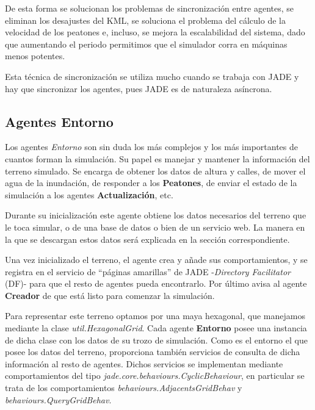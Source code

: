 De esta forma se solucionan los problemas de sincronización entre agentes, se
eliminan los desajustes del KML, se soluciona el problema del cálculo de la
velocidad de los peatones e, incluso, se mejora la escalabilidad del sistema,
dado que aumentando el periodo permitimos que el simulador corra en máquinas
menos potentes.

Esta técnica de sincronización se utiliza mucho cuando se trabaja con JADE y
hay que sincronizar los agentes, pues JADE es de naturaleza asíncrona.


\subsection*{Agentes Entorno}

Los agentes {\em Entorno} son sin duda los más complejos y los más importantes
de cuantos forman la simulación. Su papel es manejar y mantener la información
del terreno simulado. Se encarga de obtener los datos de altura y calles, de
mover el agua de la inundación, de responder a los {\bf Peatones}, de enviar el
estado de la simulación a los agentes {\bf Actualización}, etc.

Durante su inicialización este agente obtiene los datos necesarios del terreno
que le toca simular, o de una base de datos o bien de un servicio web. La manera
en la que se descargan estos datos será explicada en la sección correspondiente.

Una vez inicializado el terreno, el agente crea y añade sus comportamientos, y
se registra en el servicio de ``páginas amarillas'' de JADE -{\em Directory
Facilitator} (DF)- para que el resto de agentes pueda encontrarlo. Por último
avisa al agente {\bf Creador} de que está listo para comenzar la simulación.

Para representar este terreno optamos por una maya hexagonal, que manejamos
mediante la clase {\em util.HexagonalGrid}. Cada agente {\bf Entorno} posee una
instancia de dicha clase con los datos de su trozo de simulación. Como es el
entorno el que posee los datos del terreno, proporciona también servicios de
consulta de dicha información al resto de agentes. Dichos servicios se
implementan mediante comportamientos del tipo {\em
jade.core.behaviours.CyclicBehaviour}, en particular se trata de los
comportamientos {\em behaviours.AdjacentsGridBehav} y {\em
behaviours.QueryGridBehav}.

